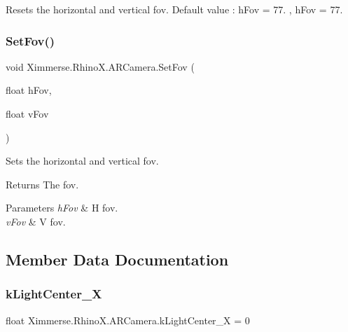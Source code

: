Resets the horizontal and vertical fov. Default value \+: h\+Fov = 77. , h\+Fov = 77. 

\mbox{\label{class_ximmerse_1_1_rhino_x_1_1_a_r_camera_aefc6422a8587e8769e5e224c2ce66148}} 
\subsubsection{\texorpdfstring{Set\+Fov()}{SetFov()}}
{\footnotesize\ttfamily void Ximmerse.\+Rhino\+X.\+A\+R\+Camera.\+Set\+Fov (\begin{DoxyParamCaption}\item[{float}]{h\+Fov,  }\item[{float}]{v\+Fov }\end{DoxyParamCaption})\hspace{0.3cm}{\ttfamily [inline]}}



Sets the horizontal and vertical fov. 

\begin{DoxyReturn}{Returns}
The fov.
\end{DoxyReturn}

\begin{DoxyParams}{Parameters}
{\em h\+Fov} & H fov.\\
\hline
{\em v\+Fov} & V fov.\\
\hline
\end{DoxyParams}


\subsection{Member Data Documentation}
\mbox{\label{class_ximmerse_1_1_rhino_x_1_1_a_r_camera_ae47108706cc7216eaa7dd50ffbef8851}} 
\subsubsection{\texorpdfstring{k\+Light\+Center\+\_\+X}{kLightCenter\_X}}
{\footnotesize\ttfamily float Ximmerse.\+Rhino\+X.\+A\+R\+Camera.\+k\+Light\+Center\+\_\+X = 0\hspace{0.3cm}{\ttfamily [static]}}



